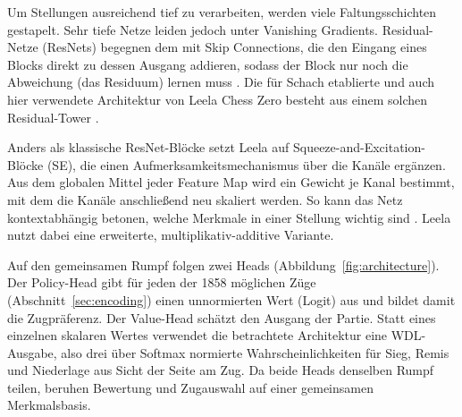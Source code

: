 \documentclass[
  a4paper, 12pt,
  parskip=half,
  headings=small,
  bibliography=totoc
]{scrartcl}
\begin{document}
Um Stellungen ausreichend tief zu verarbeiten, werden viele Faltungsschichten
gestapelt. Sehr tiefe Netze leiden jedoch unter Vanishing Gradients.
Residual-Netze (ResNets) begegnen dem mit Skip Connections,
die den Eingang eines Blocks direkt zu dessen Ausgang addieren, sodass der Block
nur noch die Abweichung (das Residuum) lernen muss \parencite{he2016}. Die für
Schach etablierte und auch hier verwendete Architektur von Leela Chess Zero
besteht aus einem solchen Residual-Tower \parencite{lczero_nn, klein2022neural}.

Anders als klassische ResNet-Blöcke setzt Leela auf
Squeeze-and-Excitation-Blöcke (SE), die einen Aufmerksamkeitsmechanismus über
die Kanäle ergänzen. Aus dem globalen Mittel jeder Feature Map wird ein Gewicht
je Kanal bestimmt, mit dem die Kanäle anschließend neu skaliert werden. So kann
das Netz kontextabhängig betonen, welche Merkmale in einer Stellung wichtig sind
\parencite{hu2018}. Leela nutzt dabei eine erweiterte, multiplikativ-additive
Variante.

Auf den gemeinsamen Rumpf folgen zwei Heads (Abbildung~\ref{fig:architecture}).
Der Policy-Head gibt für jeden der 1858 möglichen Züge (Abschnitt~\ref{sec:encoding})
einen unnormierten Wert (Logit) aus und bildet damit die Zugpräferenz. Der
Value-Head schätzt den Ausgang der Partie. Statt eines einzelnen skalaren Wertes
verwendet die betrachtete Architektur eine WDL-Ausgabe, also drei über Softmax
normierte Wahrscheinlichkeiten für Sieg, Remis und Niederlage aus Sicht der Seite
am Zug. Da beide Heads denselben Rumpf teilen, beruhen Bewertung und Zugauswahl
auf einer gemeinsamen Merkmalsbasis.
\end{document}
